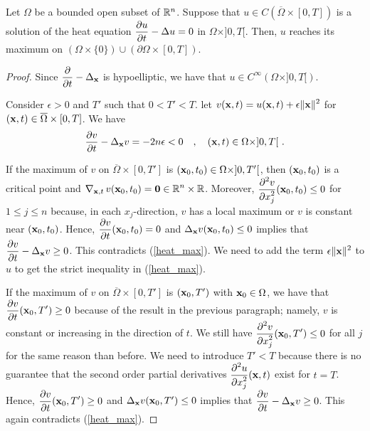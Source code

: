 \begin{theorem} 
Let $\Omega$ be a bounded open subset of $\mathbb{R}^n$.  Suppose that
$u \in C(\overline{\Omega} \times [0,T])$ is a solution of the heat
equation $\displaystyle \frac{\partial{u}}{\partial t} - \Delta u = 0$ in
$\Omega \times ]0,T[$.  Then, $u$ reaches its maximum on
$(\Omega \times \{0\}) \cup ( \partial \Omega \times [0,T])$.
\end{theorem}

\begin{proof}
Since $\displaystyle \frac{\partial{}}{\partial t}-\Delta_{\mathbf{x}}$ is hypoelliptic, we
have that $\displaystyle u \in C^\infty(\Omega\times ]0,T[)$.

Consider $\epsilon>0$ and $T'$ such that $0<T'<T$.  let
$\displaystyle v(\mathbf{x},t) = u(\mathbf{x},t) + \epsilon \|\mathbf{x}\|^2$
for $(\mathbf{x},t) \in \overline{\Omega} \times [0,T]$.  We have
\begin{equation} \label{heat_max}
\frac{\partial{v}}{\partial t} - \Delta_{\mathbf{x}} v = -2n\epsilon < 0 \quad , \quad
(\mathbf{x},t) \in \Omega \times ]0,T[ \  .
\end{equation}

If the maximum of $v$ on $\overline{\Omega}\times [0,T']$ is
$(\mathbf{x}_0,t_0) \in \Omega\times ]0,T'[$, then $(\mathbf{x}_0,t_0)$ is a
critical point and
$\displaystyle \operatorname{\nabla}_{\mathbf{x},t} v(\mathbf{x}_0,t_0) = \mathbf{0} \in \mathbb{R}^n\times \mathbb{R}$.
Moreover, $\displaystyle \frac{\displaystyle \partial^{2}{v}} {\displaystyle \partial x_j^{2}}(\mathbf{x}_0,t_0) \leq 0$ for
$1\leq j\leq n$ because, in each $x_j$-direction, $v$ has a local
maximum or $v$ is constant near $(\mathbf{x}_0,t_0)$.
Hence, $\displaystyle \frac{\partial{v}}{\partial t}(\mathbf{x}_0,t_0) =0$ and
$\Delta_{\mathbf{x}} v(\mathbf{x}_0,t_0) \leq 0$ implies that
$\displaystyle \frac{\partial{v}}{\partial t} - \Delta_{\mathbf{x}} v \geq 0$.  This
contradicts (\ref{heat_max}).  We need to add the term
$\displaystyle \epsilon \|\mathbf{x}\|^2$ to $u$ to get the strict inequality in
(\ref{heat_max}).

If the maximum of $v$ on $\overline{\Omega}\times [0,T']$ is
$(\mathbf{x}_0,T')$ with $\mathbf{x}_0 \in \Omega$, we have that
$\displaystyle \frac{\partial{v}}{\partial t}(\mathbf{x}_0,T') \geq 0$ because of the
result in the previous paragraph; namely, $v$ is
constant or increasing in the direction of $t$.  We still have
$\displaystyle \frac{\displaystyle \partial^{2}{v}} {\displaystyle \partial x_j^{2}}(\mathbf{x}_0,T') \leq 0$ for
all $j$ for the same reason than before.  We need to introduce $T'<T$
because there is no guarantee that the second order partial
derivatives $\displaystyle \frac{\displaystyle \partial^{2}{u}} {\displaystyle \partial x_j^{2}}(\mathbf{x},t)$ exist for
$t=T$.  Hence, $\displaystyle \frac{\partial{v}}{\partial t}(\mathbf{x}_0,T') \geq 0$ and
$\Delta_{\mathbf{x}} v(\mathbf{x}_0,T') \leq 0$ implies that
$\displaystyle \frac{\partial{v}}{\partial t} - \Delta_{\mathbf{x}} v \geq 0$.  This again
contradicts (\ref{heat_max}).


\end{proof}
